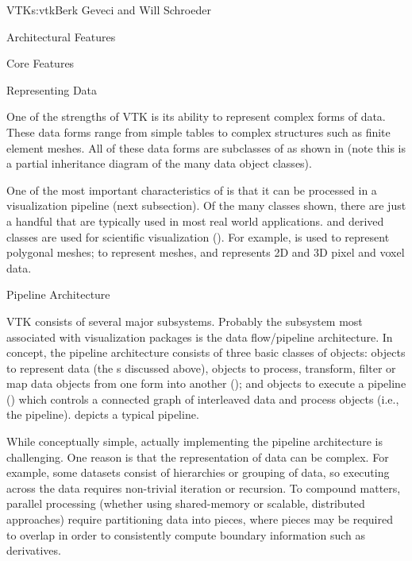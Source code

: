 \begin{aosachapter}{VTK}{s:vtk}{Berk Geveci and Will Schroeder}
\begin{aosasect1}{Architectural Features}
\begin{aosasect2}{Core Features}
\end{aosasect2}

\begin{aosasect2}{Representing Data}

One of the strengths of VTK is its ability to represent complex forms
of data. These data forms range from simple tables to complex
structures such as finite element meshes. All of these data forms are
subclasses of  as shown in
 (note this is a partial inheritance
diagram of the many data object classes).


One of the most important characteristics of  is
that it can be processed in a visualization pipeline (next
subsection). Of the many classes shown, there are just a handful that
are typically used in most real world applications. 
and derived classes are used for scientific visualization
(). For example,  is
used to represent polygonal meshes;  to
represent meshes, and  represents 2D and 3D pixel
and voxel data.


\end{aosasect2}

\begin{aosasect2}{Pipeline Architecture}

VTK consists of several major subsystems. Probably the subsystem most
associated with visualization packages is the data flow/pipeline
architecture. In concept, the pipeline architecture consists of three
basic classes of objects: objects to represent data (the
s discussed above), objects to process, transform,
filter or map data objects from one form into another
(); and objects to execute a pipeline
() which controls a connected graph of interleaved
data and process objects (i.e., the
pipeline).  depicts a typical pipeline.


While conceptually simple, actually implementing the pipeline
architecture is challenging. One reason is that the representation of
data can be complex. For example, some datasets consist of hierarchies
or grouping of data, so executing across the data requires non-trivial
iteration or recursion. To compound matters, parallel
processing (whether using shared-memory or scalable, distributed
approaches) require partitioning data into pieces, where pieces may be
required to overlap in order to consistently compute boundary
information such as derivatives.


\end{aosasect2}
\end{aosasect1}
\end{aosachapter}
